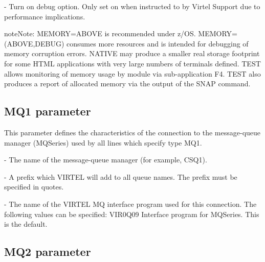 \documentclass[letterpaper,10pt,english]{sphinxmanual}
\begin{document}
 - Turn on debug option. Only set on when instructed to by Virtel Support due to performance implications.

\begin{sphinxadmonition}{note}{Note:}
MEMORY=ABOVE is recommended under z/OS. MEMORY=(ABOVE,DEBUG) consumes more resources and is intended for debugging of memory corruption errors. NATIVE may produce a smaller real storage footprint for some HTML applications with very large numbers of terminals defined. TEST allows monitoring of memory usage by module via sub-application F4. TEST also produces a report of allocated memory via the output of the SNAP command.
\end{sphinxadmonition}


\subsection{MQ1 parameter}
\label{\detokenize{Installation_Guide:mq1-parameter}}\label{\detokenize{Installation_Guide:index-90}}
\begin{sphinxVerbatim}[commandchars=\\\{\}]
\PYG{p}{[}\PYG{p}{]}           
\end{sphinxVerbatim}

This parameter defines the characteristics of the connection to the message-queue manager (MQSeries) used by all lines which specify type MQ1.

 - The name of the message-queue manager (for example, CSQ1).

 - A prefix which VIRTEL will add to all queue names. The prefix must be specified in quotes.

 - The name of the VIRTEL MQ interface program used for this connection. The following values can be specified: VIR0Q09 Interface program for MQSeries. This is the default.


\subsection{MQ2 parameter}
\label{\detokenize{Installation_Guide:mq2-parameter}}
\begin{sphinxVerbatim}[commandchars=\\\{\}]
\PYG{p}{[}\PYG{p}{]}             
\end{sphinxVerbatim}
\end{document}
